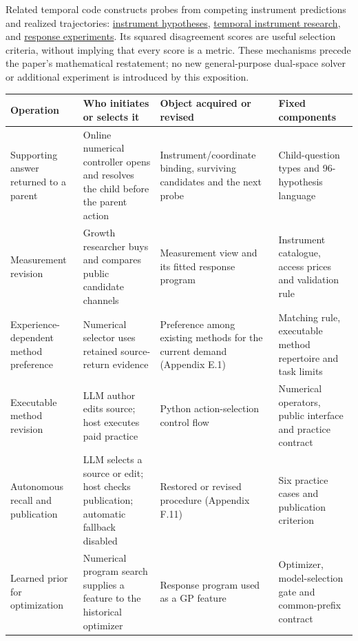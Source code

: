 \documentclass[11pt,a4paper]{article}
\begin{document}
Related temporal code constructs probes from competing instrument predictions and realized trajectories: \hyperlink{artifact-50}{instrument hypotheses}, \hyperlink{artifact-51}{temporal instrument research}, and \hyperlink{artifact-52}{response experiments}. Its squared disagreement scores are useful selection criteria, without implying that every score is a metric. These mechanisms precede the paper's mathematical restatement; no new general-purpose dual-space solver or additional experiment is introduced by this exposition.


\begingroup\small\setlength{\tabcolsep}{4pt}
\renewcommand{\arraystretch}{1.18}
\par\addvspace{.7em}\noindent\begin{minipage}{\linewidth}
\begin{tabular}{@{}>{\raggedright\arraybackslash}p{}>{\raggedright\arraybackslash}p{}>{\raggedright\arraybackslash}p{}>{\raggedright\arraybackslash}p{}@{}}
\toprule
\textbf{Operation} & \textbf{Who initiates or selects it} & \textbf{Object acquired or revised} & \textbf{Fixed components} \\
\midrule
Supporting answer returned to a parent & Online numerical controller opens and resolves the child before the parent action & Instrument/coordinate binding, surviving candidates and the next probe & Child-question types and 96-hypothesis language \\
Measurement revision & Growth researcher buys and compares public candidate channels & Measurement view and its fitted response program & Instrument catalogue, access prices and validation rule \\
Experience-dependent method preference & Numerical selector uses retained source-return evidence & Preference among existing methods for the current demand (Appendix E.1) & Matching rule, executable method repertoire and task limits \\
Executable method revision & LLM author edits source; host executes paid practice & Python action-selection control flow & Numerical operators, public interface and practice contract \\
Autonomous recall and publication & LLM selects a source or edit; host checks publication; automatic fallback disabled & Restored or revised procedure (Appendix F.11) & Six practice cases and publication criterion \\
Learned prior for optimization & Numerical program search supplies a feature to the historical optimizer & Response program used as a GP feature & Optimizer, model-selection gate and common-prefix contract \\
\bottomrule
\end{tabular}
\end{minipage}\par\addvspace{.7em}
\endgroup
\end{document}

